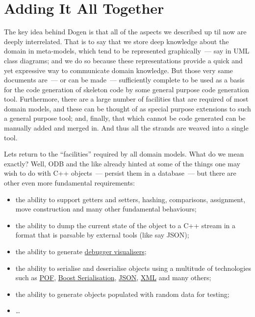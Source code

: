 \documentclass{book}
\begin{document}
\section{Adding It All Together}

The key idea behind Dogen is that all of the aspects we described up
til now are deeply interrelated. That is to say that we store deep
knowledge about the domain in meta-models, which tend to be
represented graphically~--- say in UML class diagrams; and we do so
because these representations provide a quick and yet expressive way
to communicate domain knowledge. But those very same documents are~---
or can be made~--- sufficiently complete to be used as a basis for the
code generation of skeleton code by some general purpose code
generation tool. Furthermore, there are a large number of facilities
that are required of most domain models, and these can be thought of
as special purpose extensions to such a general purpose tool; and,
finally, that which cannot be code generated can be manually added and
merged in. And thus all the strands are weaved into a single tool.

Lets return to the ``facilities'' required by all domain models. What
do we mean exactly? Well, ODB and the like already hinted at some of
the things one may wish to do with C++ objects~--- persist them in a
database~--- but there are other even more fundamental requirements:

\begin{itemize}
\item the ability to support getters and setters, hashing,
  comparisons, assignment, move construction and many other
  fundamental behaviours;
\item the ability to dump the current state of the object to a C++
  stream in a format that is parsable by external tools (like say
  JSON);
\item the ability to generate
  \href{http://stackoverflow.com/questions/5140475/how-to-write-native-c-debugger-visualizers-in-gdb-totalview-for-complicated-t}{debugger
    visualisers};
\item the ability to serialise and deserialise objects using a
  multitude of technologies such as
  \href{http://download.oracle.com/otn_hosted_doc/coherence/353CPP/index.html}{POF},
  \href{http://www.boost.org/doc/libs/1_55_0/libs/serialization/doc/index.html}{Boost
    Serialisation}, \href{https://github.com/hjiang/jsonxx}{JSON},
  \href{http://libxmlplusplus.sourceforge.net/}{XML} and many others;
\item the ability to generate objects populated with random data for
  testing;
\item \ldots{}
\end{itemize}
\end{document}
